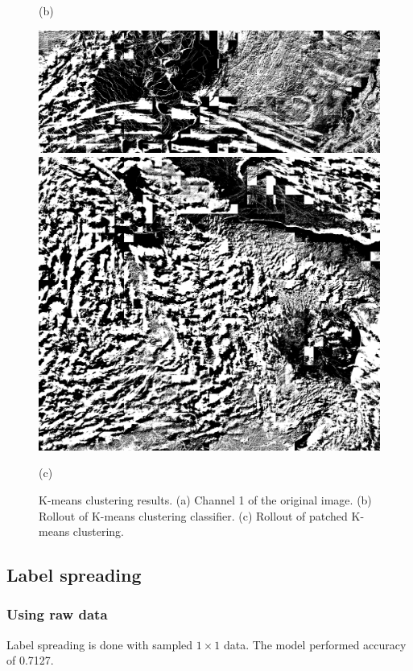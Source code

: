\documentclass{article}
\begin{document}
\begin{figure}[h]
\begin{minipage}{0.3\hsize}
                \caption*{(b)}
            \end{minipage}
            \begin{minipage}{0.3\hsize}
                \centering
                \includegraphics[width = 1\hsize]{1_kmeans_patched.png}
                \includegraphics[width = 1\hsize]{2_kmeans_patched.png}
                \caption*{(c)}
            \end{minipage}
            \caption{
                K-means clustering results.
                (a) Channel 1 of the original image.
                (b) Rollout of K-means clustering classifier.
                (c) Rollout of patched K-means clustering.
            }
            \label{fig:kmeans}
        \end{figure}

    \subsection{Label spreading} \label{sec:label}
        \subsubsection{Using raw data}
            Label spreading is done with sampled $1\times 1$ data.
            The model performed accuracy of 0.7127.
\end{document}
